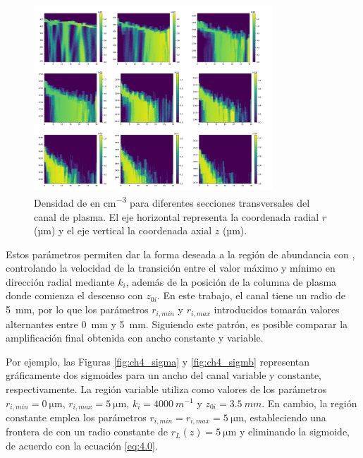 \begin{figure}[htbp]
  \centering
  \includegraphics[width=0.8\textwidth]{Figuras/ch4_ionkr8.png}
  \caption{Densidad de  en \unit{cm^{-3}} para diferentes secciones transversales del canal de plasma. El eje horizontal representa la coordenada radial $r$ (\unit{µm}) y el eje vertical la coordenada axial $z$ (\unit{µm}).}
  \label{fig:4.2}
\end{figure}

Estos parámetros permiten dar la forma deseada a la región de abundancia con , controlando la velocidad de la transición entre el valor máximo y mínimo en dirección radial mediante $k_{i}$, además de la posición de la columna de plasma donde comienza el descenso con $z_{0i}$. En este trabajo, el canal tiene un radio de \qty{5}{mm}, por lo que los parámetros $r_{i,min}$ y $r_{i,max}$ introducidos tomarán valores alternantes entre \qty{0}{mm} y \qty{5}{mm}. Siguiendo este patrón, es posible comparar la amplificación final obtenida con ancho constante y variable.

Por ejemplo, las Figuras \ref{fig:ch4_sigma} y \ref{fig:ch4_sigmb} representan gráficamente dos sigmoides para un ancho del canal variable y constante, respectivamente. La región variable utiliza como valores de los parámetros $r_{i,min}=\qty{0}{\um}$, $r_{i,max}=\qty{5}{\um}$, $k_{i}=\qty{4000}{m^{-1}}$ y $z_{0i}=\qty{3.5}{mm}$. En cambio, la región constante emplea los parámetros $r_{i,min}=r_{i,max}=\qty{5}{\um}$, estableciendo una frontera de  con un radio constante de $r_{L}(z)=\qty{5}{\um}$ y eliminando la sigmoide, de acuerdo con la ecuación \eqref{eq:4.0}.

